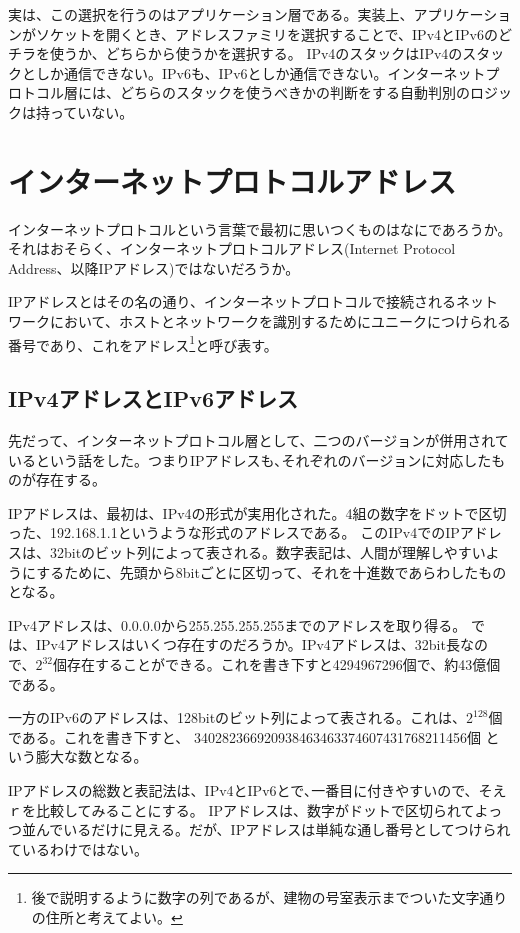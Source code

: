 実は、この選択を行うのはアプリケーション層である。実装上、アプリケーションがソケットを開くとき、アドレスファミリを選択することで、IPv4とIPv6のどチラを使うか、どちらから使うかを選択する。
IPv4のスタックはIPv4のスタックとしか通信できない。IPv6も、IPv6としか通信できない。インターネットプロトコル層には、どちらのスタックを使うべきかの判断をする自動判別のロジックは持っていない。


\section{インターネットプロトコルアドレス}

インターネットプロトコルという言葉で最初に思いつくものはなにであろうか。それはおそらく、インターネットプロトコルアドレス(Internet Protocol Address、以降IPアドレス)ではないだろうか。

IPアドレスとはその名の通り、インターネットプロトコルで接続されるネットワークにおいて、ホストとネットワークを識別するためにユニークにつけられる番号であり、これをアドレス\footnote{後で説明するように数字の列であるが、建物の号室表示までついた文字通りの住所と考えてよい。}と呼び表す。

\subsection{IPv4アドレスとIPv6アドレス}

先だって、インターネットプロトコル層として、二つのバージョンが併用されているという話をした。つまりIPアドレスも､それぞれのバージョンに対応したものが存在する。

IPアドレスは、最初は、IPv4の形式が実用化された。4組の数字をドットで区切った、192.168.1.1というような形式のアドレスである。
このIPv4でのIPアドレスは、32bitのビット列によって表される。数字表記は、人間が理解しやすいようにするために、先頭から8bitごとに区切って、それを十進数であらわしたものとなる。

IPv4アドレスは、0.0.0.0から255.255.255.255までのアドレスを取り得る。
では、IPv4アドレスはいくつ存在すのだろうか。IPv4アドレスは、32bit長なので、$2^{32}$個存在することができる。これを書き下すと4294967296個で、約43億個である。


一方のIPv6のアドレスは、128bitのビット列によって表される。これは、$2^{128}$個である。これを書き下すと、
340282366920938463463374607431768211456個
という膨大な数となる。

IPアドレスの総数と表記法は、IPv4とIPv6とで､一番目に付きやすいので、そえｒを比較してみることにする。
IPアドレスは、数字がドットで区切られてよっつ並んでいるだけに見える。だが、IPアドレスは単純な通し番号としてつけられているわけではない。

